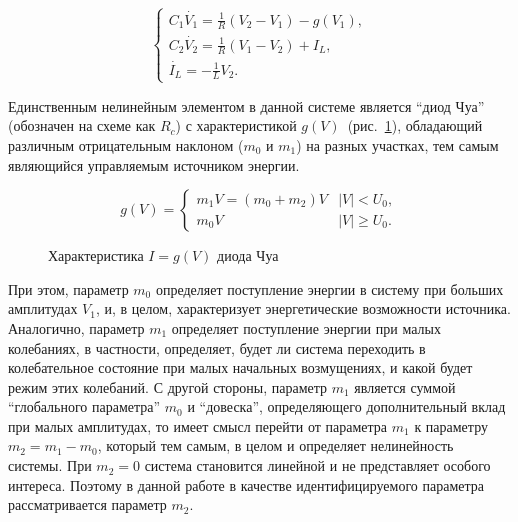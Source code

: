 \documentclass[a4paper,12pt]{article}
\begin{document}
\begin{equation}
\begin{cases}
  C_1 \dot{V_1}  = \frac{1}{R} ( V_2 - V_1 ) - g(V_1), \\
  C_2 \dot{V_2}  = \frac{1}{R} ( V_1 - V_2 ) + I_L, \\
  \dot{I_L}      = - \frac{1}{L} V_2 .
\end{cases}
\label{atu:eq:chua}
\end{equation}

Единственным нелинейным элементом в данной системе является ``диод Чуа''
(обозначен на схеме как $R_c$) с
характеристикой $g(V)$~(рис.~\ref{atu:f:diodchua}),
обладающий различным отрицательным наклоном
($m_0$ и $m_1$) на разных участках,
тем самым являющийся управляемым источником энергии.


\begin{equation}
g(V) =
\begin{cases}
  m_1 V = ( m_0 + m_2 ) V & |V| <   U_0, \\
  m_0 V                   & |V| \ge U_0.
\end{cases}
\label{atu:eq:diodchua}
\end{equation}

\begin{figure}[htb!]
\begin{center}
\end{center}
\caption{Характеристика \(I=g(V)\) диода Чуа}
\label{atu:f:diodchua}
\end{figure}


При этом, параметр \(m_0\) определяет поступление энергии в систему
при больших амплитудах \(V_1\), и, в целом, характеризует
энергетические возможности источника.
Аналогично, параметр \(m_1\) определяет поступление энергии
при малых колебаниях, в частности, определяет, будет ли
система переходить в колебательное состояние при малых начальных
возмущениях, и какой будет режим этих колебаний.
С другой стороны, параметр \(m_1\) является суммой
``глобального параметра'' \(m_0\) и ``довеска'',
определяющего дополнительный вклад при малых амплитудах,
то имеет смысл перейти от параметра \(m_1\) к параметру
\( m_2 = m_1 - m_0 \), который тем самым, в целом
и определяет нелинейность
системы. При \( m_2 = 0 \) система становится линейной
и не представляет особого интереса. Поэтому
в данной работе в качестве
идентифицируемого параметра рассматривается параметр \(m_2\).
\end{document}
